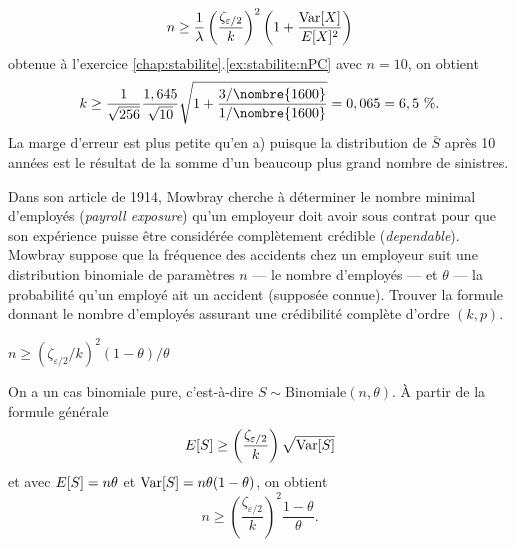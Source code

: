 \begin{exercice}
\begin{sol}
\begin{enumerate}
      \begin{displaymath}
        n \geq \frac{1}{\lambda}
        \left(
          \frac{\zeta_{\varepsilon/2}}{k}
        \right)^2
        \left(
          1 + \frac{\operatorname{Var} [ X ]}{E [ X ]^2}
        \right)
      \end{displaymath}
      obtenue à l'exercice \ref{chap:stabilite}.\ref{ex:stabilite:nPC}
      avec $n = 10$, on obtient
      \begin{displaymath}
        k \geq
        \frac{1}{\sqrt{256}} \frac{1,645}{\sqrt{10}}
        \sqrt{1 + \frac{3/\nombre{1600}}{1/\nombre{1600}}} = 0,065 = 6,5~\%.
      \end{displaymath}
      La marge d'erreur est plus petite qu'en a) puisque la
      distribution de $\bar{S}$ après 10 années est le résultat de la
      somme d'un beaucoup plus grand nombre de sinistres.
    \end{enumerate}
  \end{sol}
\end{exercice}

\begin{exercice}
  Dans son article de 1914, Mowbray cherche à déterminer le nombre
  minimal d'employés (\emph{payroll exposure}) qu'un employeur doit
  avoir sous contrat pour que son expérience puisse être considérée
  complètement crédible (\emph{dependable}). Mowbray suppose que la
  fréquence des accidents chez un employeur suit une distribution
  binomiale de paramètres $n$ --- le nombre d'employés --- et $\theta$
  --- la probabilité qu'un employé ait un accident (supposée connue).
  Trouver la formule donnant le nombre d'employés assurant une
  crédibilité complète d'ordre $(k, p)$.
  \begin{rep}
    $n \geq (\zeta_{\varepsilon/2}/k)^2 (1 - \theta)/\theta$
  \end{rep}
  \begin{sol}
    On a un cas binomiale pure, c'est-à-dire $S \sim
    \text{Binomiale}(n, \theta)$. À partir de la formule générale
    \begin{displaymath}
      E [ S ] \geq \left( \frac{\zeta_{\varepsilon/2}}{k} \right)
      \sqrt{\operatorname{Var} [ S ]}
    \end{displaymath}
    et avec $E [ S ] = n \theta$ et $\operatorname{Var} [ S ] = n \theta (1 - \theta)$,
    on obtient
    \begin{displaymath}
      n \geq \left( \frac{\zeta_{\varepsilon/2}}{k} \right)^2
      \frac{1 - \theta}{\theta}.
    \end{displaymath}
  \end{sol}
\end{exercice}

